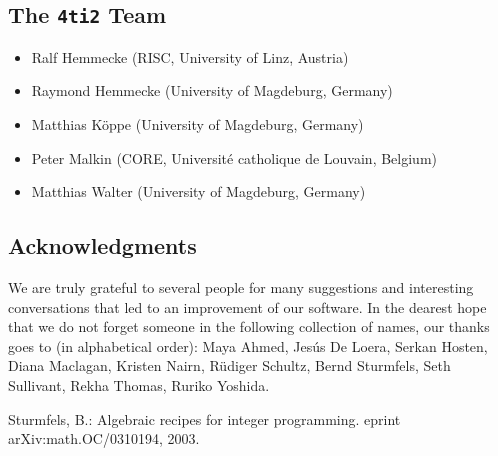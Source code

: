 \documentclass[12pt]{article}
\theoremstyle{definition}
\newcommand{\FourTiTwo}{{\tt 4ti2}}
\begin{document}
\subsection{The \FourTiTwo{} Team}
\begin{itemize}
\item Ralf Hemmecke (RISC, University of Linz, Austria)
\item Raymond Hemmecke (University of Magdeburg, Germany)
\item Matthias K\"oppe (University of Magdeburg, Germany)
\item Peter Malkin (CORE, Universit\'e catholique de Louvain, Belgium)
\item Matthias Walter (University of Magdeburg, Germany)
\end{itemize}







\subsection{Acknowledgments}

We are truly grateful to several people for many suggestions and
interesting conversations that led to an improvement of our
software. In the dearest hope that we do not forget someone in the
following collection of names, our thanks goes to (in alphabetical
order): Maya Ahmed, Jes\'us De Loera, Serkan Hosten, Diana Maclagan,
Kristen Nairn, R\"udiger Schultz, Bernd Sturmfels, Seth Sullivant,
Rekha Thomas, Ruriko Yoshida. 


\begin{thebibliography}{99}
Sturmfels, B.: Algebraic recipes for integer programming. 
eprint arXiv:math.OC/0310194, 2003.
\end{thebibliography}	
\end{document}
